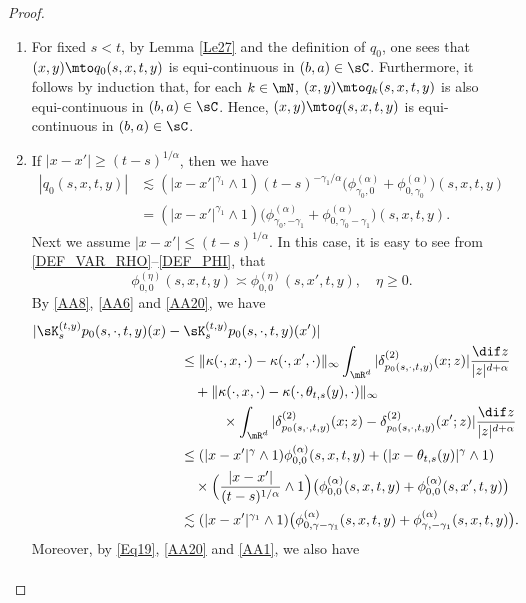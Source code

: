 \begin{proof}
\begin{enumerate}
\item
For fixed $s<t$, by Lemma \ref{Le27} and the definition of $q_0$, one sees that $(x,y)\mto q_0(s,x,t,y)$ is equi-continuous in $(b,a)\in\sC$.
Furthermore, it follows by induction that, for each $k\in\mN$,
$(x,y)\mto q_k(s,x,t,y)$ is also equi-continuous in $(b,a)\in\sC$. Hence,
$(x,y)\mto q(s,x,t,y)$ is equi-continuous in $(b,a)\in\sC$.

\item
If $|x-x'|\geq (t-s)^{1/\alpha}$, then we have
\begin{align*}
|q_0(s,x,t,y)|&\lesssim (|x-x'|^{\gamma_1}\wedge 1)(t-s)^{-\gamma_1/\alpha}\bigl(\phi^{(\alpha)}_{\gamma_0,0}+\phi^{(\alpha)}_{0,\gamma_0}\bigr)(s,x,t,y)
\\&=(|x-x'|^{\gamma_1}\wedge 1)\bigl(\phi^{(\alpha)}_{\gamma_0,-\gamma_1}+\phi^{(\alpha)}_{0,\gamma_0-\gamma_1}\bigr)(s,x,t,y).
\end{align*}
Next we assume $|x-x'|\leq (t-s)^{1/\alpha}$. In this case, it is easy to see from \eqref{DEF_VAR_RHO}--\eqref{DEF_PHI}, that
\begin{equation}\label{AA20}
\phi^{(\eta)}_{0,0}(s,x,t,y)\asymp\phi^{(\eta)}_{0,0}(s,x',t,y),\quad \eta\geq 0.
\end{equation}
By \eqref{AA8}, \eqref{AA6} and \eqref{AA20}, we have
\begin{align*}
|\sK^{(t,y)}_{s}p_0(s,\cdot,t,y)(x)&-\sK^{(t,y)}_{s}p_0(s,\cdot,t,y)(x')|
\\&\quad\leq \|\kappa(\cdot,x,\cdot)-\kappa(\cdot,x',\cdot)\|_\infty \int_{\mR^d}|\delta^{(2)}_{p_0(s,\cdot,t,y)}(x;z)|\frac{\dif z}{|z|^{d+\alpha}}
\\&\qquad+\|\kappa(\cdot,x,\cdot)-\kappa(\cdot,\theta_{t,s}(y),\cdot)\|_\infty
\\&\qquad\qquad\times\int_{\mR^d}|\delta^{(2)}_{p_0(s,\cdot,t,y)}(x;z)-\delta^{(2)}_{p_0(s,\cdot,t,y)}(x';z)|\frac{\dif z}{|z|^{d+\alpha}}
\\&\quad\leq (|x-x'|^{\gamma}\wedge 1)\phi^{(\alpha)}_{0,0}(s,x,t,y)+(|x-\theta_{t,s}(y)|^\gamma\wedge 1)
\\&\qquad\times\Bigl(\frac{|x-x'|}{(t-s)^{1/\alpha}}\wedge 1\Bigr)\bigl(\phi^{(\alpha)}_{0,0}(s,x,t,y)+\phi^{(\alpha)}_{0,0}(s,x',t,y)\bigr)
\\&\quad\lesssim (|x-x'|^{\gamma_1}\wedge 1)\bigl(\phi^{(\alpha)}_{0,\gamma-\gamma_1}(s,x,t,y)+\phi^{(\alpha)}_{\gamma,-\gamma_1}(s,x,t,y)\bigr){.}
\end{align*}
Moreover, by \eqref{Eq19}, \eqref{AA20} and \eqref{AA1}, we also have
\begin{align*}

\end{align*}
\end{enumerate}
\end{proof}
